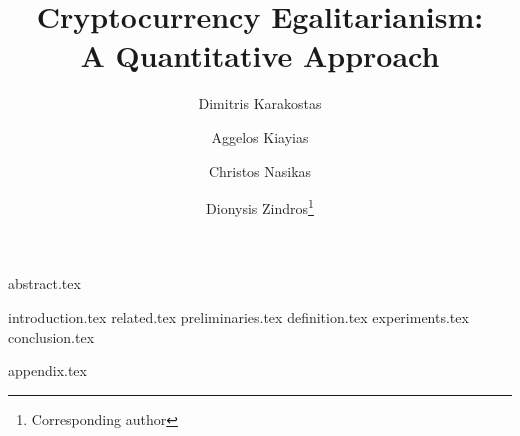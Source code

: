 \documentclass[a4paper,UKenglish,cleveref, autoref]{oasics-v2019}
\title{Cryptocurrency Egalitarianism:\protect\\A Quantitative Approach} %
\author{Dimitris Karakostas}{University of Edinburgh, IOHK}{dimitris.karakostas@ed.ac.uk}{}{}%
\author{Aggelos Kiayias}{University of Edinburgh, IOHK}{akiayias@inf.ed.ac.uk}{}{}
\author{Christos Nasikas}{University of Athens, ``Athena'' Research Center}{xnasikas@di.uoa.gr}{}{}
\author{Dionysis Zindros\footnote{Corresponding author}}{University of Athens, IOHK}{dionyziz@di.uoa.gr}{}{}
\begin{document}
\maketitle
{abstract.tex}

{introduction.tex}
{related.tex}
{preliminaries.tex}
{definition.tex}
{experiments.tex}
{conclusion.tex}
\iflncs

\else

\fi


\newpage
{appendix.tex}
\end{document}
